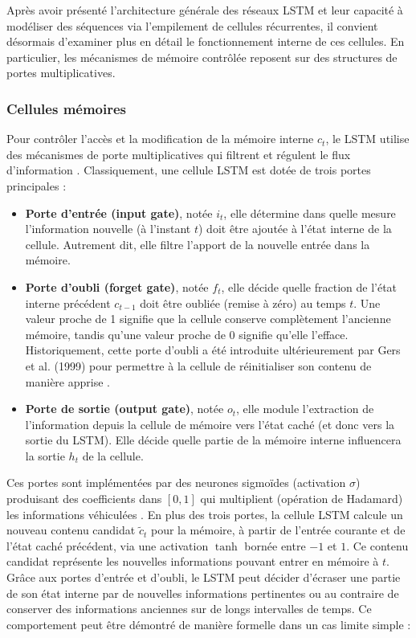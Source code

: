 Après avoir présenté l’architecture générale des réseaux LSTM et leur capacité à modéliser des séquences via l’empilement de cellules récurrentes, il convient désormais d’examiner plus en détail le fonctionnement interne de ces cellules. En particulier, les mécanismes de mémoire contrôlée reposent sur des structures de portes multiplicatives.

\subsubsection{Cellules mémoires}

Pour contrôler l’accès et la modification de la mémoire interne $c_t$, le LSTM utilise des mécanismes de porte multiplicatives qui filtrent et régulent le flux d’information \citep{d2l2020}. Classiquement, une cellule LSTM est dotée de trois portes principales :

\begin{itemize}
    \item \textbf{Porte d’entrée (input gate)}, notée $i_t$, elle détermine dans quelle mesure l’information nouvelle (à l’instant $t$) doit être ajoutée à l’état interne de la cellule. Autrement dit, elle filtre l’apport de la nouvelle entrée dans la mémoire.
    
    \item \textbf{Porte d’oubli (forget gate)}, notée $f_t$, elle décide quelle fraction de l’état interne précédent $c_{t-1}$ doit être oubliée (remise à zéro) au temps $t$. Une valeur proche de 1 signifie que la cellule conserve complètement l’ancienne mémoire, tandis qu’une valeur proche de 0 signifie qu’elle l’efface. Historiquement, cette porte d’oubli a été introduite ultérieurement par Gers et al. (1999) pour permettre à la cellule de réinitialiser son contenu de manière apprise \citep{gers1999learning}.
    
    \item \textbf{Porte de sortie (output gate)}, notée $o_t$, elle module l’extraction de l’information depuis la cellule de mémoire vers l’état caché (et donc vers la sortie du LSTM). Elle décide quelle partie de la mémoire interne influencera la sortie $h_t$ de la cellule.
\end{itemize}

Ces portes sont implémentées par des neurones sigmoïdes (activation $\sigma$) produisant des coefficients dans $[0,1]$ qui multiplient (opération de Hadamard) les informations véhiculées \citep{d2l2020}. En plus des trois portes, la cellule LSTM calcule un nouveau contenu candidat $\tilde{c}_t$ pour la mémoire, à partir de l’entrée courante et de l’état caché précédent, via une activation $\tanh$ bornée entre $-1$ et $1$. Ce contenu candidat représente les nouvelles informations pouvant entrer en mémoire à $t$. Grâce aux portes d’entrée et d’oubli, le LSTM peut décider d’écraser une partie de son état interne par de nouvelles informations pertinentes ou au contraire de conserver des informations anciennes sur de longs intervalles de temps. Ce comportement peut être démontré de manière formelle dans un cas limite simple :

